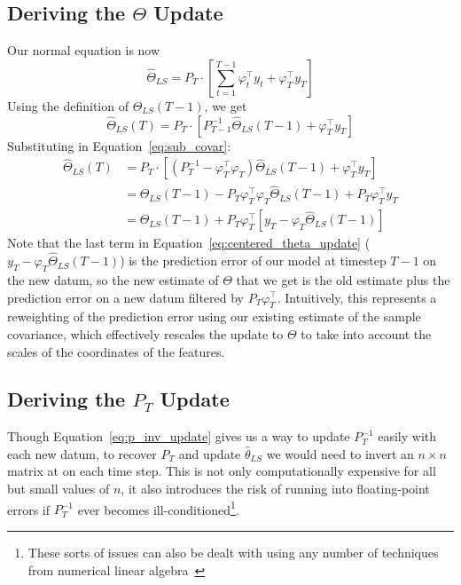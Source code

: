 \subsection{Deriving the $\Theta$ Update}
Our normal equation is now
\begin{equation}
  \hat\Theta_{LS} = P_T \cdot \left[\sum_{t=1}^{T-1} \varphi_t^\top y_t + \varphi_T^\top y_T
\right]
\end{equation}
Using the definition of $\hat\Theta_{LS}(T - 1)$, we get
\begin{equation}
  \hat\Theta_{LS}(T) = P_T \cdot \left[P_{T-1}^{-1} \hat\Theta_{LS}(T-1) + \varphi_T^\top y_T\right]
\end{equation}
Substituting in Equation~\ref{eq:sub_covar}:
\begin{align}
  \hat\Theta_{LS}(T) &= P_T \cdot \left[(P_{T}^{-1} - \varphi_T^\top \varphi_T) \hat\Theta_{LS}(T-1) + \varphi_T^\top y_T\right] \\
                     &= \hat\Theta_{LS}(T - 1) - P_T \varphi_T^\top \varphi_T \hat\Theta_{LS}(T-1) + P_T \varphi_T^\top y_T \\
                     &= \hat\Theta_{LS}(T - 1) + P_T \varphi_T^\top \left[y_T - \varphi_T\hat\Theta_{LS}(T-1)\right] \label{eq:centered_theta_update}
\end{align}
Note that the last term in Equation~\ref{eq:centered_theta_update} ($y_T -
\varphi_T\hat\Theta_{LS}(T-1)$) is the prediction error of our model at
timestep $T-1$ on the new datum, so the new estimate of $\Theta$ that we get is
the old estimate plus the prediction error on a new datum filtered by $P_T
\varphi_T^\top$. Intuitively, this represents a reweighting of the prediction
error using our existing estimate of the sample covariance, which effectively
rescales the update to $\Theta$ to take into account the scales of the
coordinates of the features.

\subsection{Deriving the $P_T$ Update}
Though Equation~\ref{eq:p_inv_update} gives us a way to update $P_T^{-1}$
easily with each new datum, to recover $P_T$ and update
$\hat\theta_{LS}$ we would need to invert an $n\times n$ matrix at on each time
step. This is not only computationally expensive for all but small values of
$n$, it also introduces the risk of running into floating-point errors if
$P_T^{-1}$ ever becomes ill-conditioned\footnote{These sorts of issues can also
be dealt with using any number of techniques from numerical linear
algebra~\cite{trefethen1997numerical}}.

